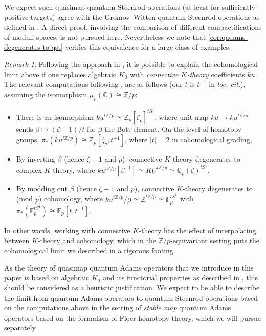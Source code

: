 \documentclass[reqno]{amsart}
\numberwithin{equation}{section}
\numberwithin{equation}{section}
\numberwithin{equation}{section}
\theoremstyle{definition}
\theoremstyle{remark}
\theoremstyle{remark}
\newtheorem{rem}[thm]{Remark}
\begin{document}
We expect such quasimap quantum Steenrod operations (at least for sufficiently positive targets) agree with the Gromov--Witten quantum Steenrod operations as defined in \cite{seidel-wilkins, Lee23b}. A direct proof, involving the comparison of different compactifications of moduli spaces, is not pursued here. Nevertheless we note that \cref{cor:qadams-degenerates-to-qst} verifies this equivalence for a large class of examples.



\begin{rem}\label{rem:degeneration-k-to-h}
Following the approach in \cite[Remark 9.8]{devalapurkar-satake}, it is possible to explain the cohomological limit above if one replaces algebraic $K_0$ with \emph{connective $K$-theory} coefficients $ku$. The relevant computations following \cite{devalapurkar-satake}, are as follows (our $t$ is $t^{-1}$ in \emph{loc. cit.}), assuming the isomorphism $\mu_p(\mathbb{C}) \cong \mathbb{Z}/p$:
\begin{itemize}
    \item There is an isomorphism $ku^{t\mathbb{Z}/p} \simeq \mathbb{Z}_p[\zeta_p]^{tS^1} $, where unit map $ku \to ku^{t\mathbb{Z}/p}$ sends $\beta \mapsto (\zeta-1)/t$ for $\beta$ the Bott element. On the level of homotopy groups, $\pi_*(ku^{t\mathbb{Z}/p}) \cong \mathbb{Z}_p[\zeta_p, t^{\pm 1}]$, where $|t|=2$ in cohomological grading, 
    \item By inverting $\beta$ (hence $\zeta-1$ and $p$), connective $K$-theory degenerates to complex $K$-theory, where $ku^{t\mathbb{Z}/p}[\beta^{-1}] \simeq KU^{t\mathbb{Z}/p} \simeq \mathbb{Q}_p(\zeta)^{tS^1}$.
    \item By modding out $\beta$  (hence $\zeta-1$ and $p$), connective $K$-theory degenerates to (mod $p$) cohomology, where $ku^{t\mathbb{Z}/p} /\beta \simeq \mathbb{Z}^{t\mathbb{Z}/p} \simeq \mathbb{F}_p^{tS^1}$ with $\pi_*(\mathbb{F}_p^{tS^1}) \cong \mathbb{F}_p[t, t^{-1}]$.
\end{itemize}
In other words, working with connective $K$-theory has the effect of interpolating between $K$-theory and cohomology, which in the $\mathbb{Z}/p$-equivariant setting puts the cohomological limit we described in a rigorous footing.

As the theory of quasimap quantum Adams operators that we introduce in this paper is based on algebraic $K_0$ and its functorial properties as described in \cite[Chapter 5]{chriss-ginzburg}, this should be considered as a heuristic justification. We expect to be able to describe the limit from quantum Adams operators to quantum Steenrod operations based on the computations above in the setting of \emph{stable map} quantum Adams operators based on the formalism of Floer homotopy theory, which we will pursue separately.
\end{rem}
\end{document}
